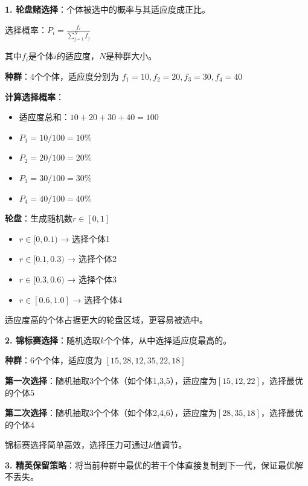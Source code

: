 \textbf{1. 轮盘赌选择}：个体被选中的概率与其适应度成正比。

\begin{formulabox}
选择概率：$P_i = \frac{f_i}{\sum_{j=1}^{N} f_j}$

其中$f_i$是个体$i$的适应度，$N$是种群大小。
\end{formulabox}

\begin{examplebox}[例子：轮盘赌选择]
\textbf{种群}：4个个体，适应度分别为 $f_1=10, f_2=20, f_3=30, f_4=40$

\textbf{计算选择概率}：
\begin{itemize}[itemsep=0pt]
    \item 适应度总和：$10+20+30+40=100$
    \item $P_1 = 10/100 = 10\%$
    \item $P_2 = 20/100 = 20\%$
    \item $P_3 = 30/100 = 30\%$
    \item $P_4 = 40/100 = 40\%$
\end{itemize}

\textbf{轮盘}：生成随机数$r \in [0,1]$
\begin{itemize}[itemsep=0pt]
    \item $r \in [0, 0.1)$ → 选择个体1
    \item $r \in [0.1, 0.3)$ → 选择个体2
    \item $r \in [0.3, 0.6)$ → 选择个体3
    \item $r \in [0.6, 1.0]$ → 选择个体4
\end{itemize}
适应度高的个体占据更大的轮盘区域，更容易被选中。
\end{examplebox}

\textbf{2. 锦标赛选择}：随机选取$k$个个体，从中选择适应度最高的。

\begin{examplebox}[例子：锦标赛选择（k=3）]
\textbf{种群}：6个个体，适应度为 $[15, 28, 12, 35, 22, 18]$

\textbf{第一次选择}：随机抽取3个个体（如个体1,3,5），适应度为$[15, 12, 22]$，选择最优的个体5

\textbf{第二次选择}：随机抽取3个个体（如个体2,4,6），适应度为$[28, 35, 18]$，选择最优的个体4

锦标赛选择简单高效，选择压力可通过$k$值调节。
\end{examplebox}

\textbf{3. 精英保留策略}：将当前种群中最优的若干个体直接复制到下一代，保证最优解不丢失。

